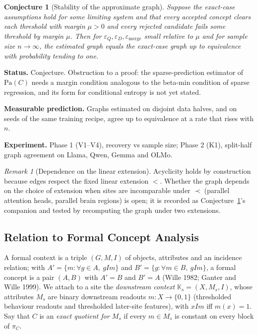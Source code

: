 \documentclass[11pt]{article}
\theoremstyle{definition}
\theoremstyle{plain}
\newtheorem{conjecture}[definition]{Conjecture}
\theoremstyle{remark}
\newtheorem{remark}[definition]{Remark}
\newcommand{\pa}{\mathrm{Pa}}
\newcommand{\Part}{\pi}
\newcommand{\status}[1]{\par\noindent\textbf{Status.} #1}
\newcommand{\predict}[1]{\par\noindent\textbf{Measurable prediction.} #1}
\newcommand{\experiment}[1]{\par\noindent\textbf{Experiment.} #1\par\medskip}
\begin{document}
\begin{conjecture}[Stability of the approximate graph]\label{conj:stable}
Suppose the exact-case assumptions hold for some limiting system and that
every accepted concept clears each threshold with margin $\mu>0$ and every
rejected candidate fails some threshold by margin $\mu$. Then for
$\varepsilon_Q,\varepsilon_D,\varepsilon_{\mathrm{merge}}$ small relative to
$\mu$ and for sample size $n\to\infty$, the estimated graph equals the
exact-case graph up to equivalence with probability tending to one.
\end{conjecture}
\status{Conjecture. Obstruction to a proof: the sparse-prediction estimator
of $\pa(C)$ needs a margin condition analogous to the beta-min condition of
sparse regression, and its form for conditional entropy is not yet stated.}
\predict{Graphs estimated on disjoint data halves, and on seeds of the same
training recipe, agree up to equivalence at a rate that rises with $n$.}
\experiment{Phase 1 (V1--V4), recovery vs sample size; Phase 2 (K1),
split-half graph agreement on Llama, Qwen, Gemma and OLMo.}

\begin{remark}[Dependence on the linear extension]
Acyclicity holds by construction because edges respect the fixed linear
extension $<$. Whether the graph depends on the choice of extension when sites
are incomparable under $\prec$ (parallel attention heads, parallel brain
regions) is open; it is recorded as Conjecture~\ref{conj:stable}'s companion
and tested by recomputing the graph under two extensions.
\end{remark}

\subsection{Relation to Formal Concept Analysis}

A formal context is a triple $(G,M,I)$ of objects, attributes and an
incidence relation; with $A'=\{m:\forall g\in A,\ gIm\}$ and
$B'=\{g:\forall m\in B,\ gIm\}$, a formal concept is a pair $(A,B)$ with
$A'=B$ and $B'=A$ (Wille 1982; Ganter and Wille 1999). We attach to a site the
\emph{downstream context} $\mathbb{K}_s=(X,M_s,I)$, whose attributes $M_s$ are
binary downstream readouts $m\colon X\to\{0,1\}$ (thresholded behaviour
readouts and thresholded later-site features), with $xIm$ iff $m(x)=1$. Say
that $C$ is an \emph{exact quotient for $M_s$} if every $m\in M_s$ is constant
on every block of $\Part_C$.
\end{document}
